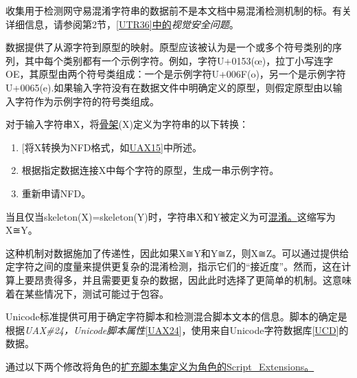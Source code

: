 \documentclass[
]{article}
\begin{document}
收集用于检测网守易混淆字符串的数据前不是本文档中易混淆检测机制的标。有关详细信息，请参阅第2节，{[}\href{https://www-unicode-org.translate.goog/reports/tr39/tr39-22.html?_x_tr_sl=auto\&_x_tr_tl=zh-CN\&_x_tr_hl=zh-CN\#UTR36}{UTR36{]}中的}\emph{视觉安全问题}。

数据提供了从源字符到原型的映射。原型应该被认为是一个或多个符号类别的序列，其中每个类别都有一个示例字符。例如，字符U+0153(œ)，拉丁小写连字OE，其原型由两个符号类组成：一个是示例字符U+006F(o)，另一个是示例字符U+0065(e).如果输入字符没有在数据文件中明确定义的原型，则假定原型由以输入字符作为示例字符的符号类组成。

对于输入字符串X，将\href{https://www-unicode-org.translate.goog/reports/tr39/tr39-22.html?_x_tr_sl=auto\&_x_tr_tl=zh-CN\&_x_tr_hl=zh-CN\#def-skeleton}{骨架}(X)定义为字符串的以下转换：

\begin{enumerate}
\def\labelenumi{\arabic{enumi}.}
\item
  {[}将X转换为NFD格式，如\href{https://www-unicode-org.translate.goog/reports/tr39/tr39-22.html?_x_tr_sl=auto\&_x_tr_tl=zh-CN\&_x_tr_hl=zh-CN\#UAX15}{UAX15}{]}中所述。
\item
  根据指定数据连接X中每个字符的原型，生成一串示例字符。
\item
  重新申请NFD。
\end{enumerate}

当且仅当skeleton(X)=skeleton(Y)时，字符串X和Y被定义为可\href{https://www-unicode-org.translate.goog/reports/tr39/tr39-22.html?_x_tr_sl=auto\&_x_tr_tl=zh-CN\&_x_tr_hl=zh-CN\#def-confusable}{混淆。}这缩写为X≅Y。

这种机制对数据施加了传递性，因此如果X≅Y和Y≅Z，则X≅Z。可以通过提供给定字符之间的度量来提供更复杂的混淆检测，指示它们的``接近度''。然而，这在计算上要昂贵得多，并且需要更复杂的数据，因此此时选择了更简单的机制。这意味着在某些情况下，测试可能过于包容。

Unicode标准提供可用于确定字符脚本和检测混合脚本文本的信息。脚本的确定是根据\emph{UAX\#24，Unicode脚本属性}{[}\href{https://www-unicode-org.translate.goog/reports/tr39/tr39-22.html?_x_tr_sl=auto\&_x_tr_tl=zh-CN\&_x_tr_hl=zh-CN\#UAX24}{UAX24}{]}，使用来自Unicode字符数据库{[}\href{https://www-unicode-org.translate.goog/reports/tr39/tr39-22.html?_x_tr_sl=auto\&_x_tr_tl=zh-CN\&_x_tr_hl=zh-CN\#UCD}{UCD}{]}的数据。

通过以下两个修改将角色的\href{https://www-unicode-org.translate.goog/reports/tr39/tr39-22.html?_x_tr_sl=auto\&_x_tr_tl=zh-CN\&_x_tr_hl=zh-CN\#def-augmented-script-set}{扩充脚本集定义为角色的Script\_Extensions。}
\end{document}
